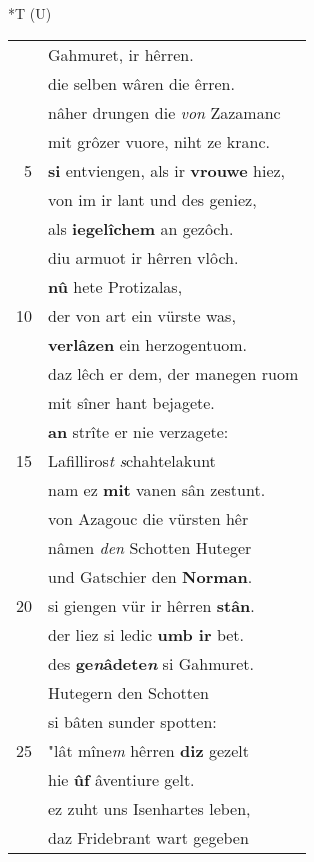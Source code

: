 \documentclass[8pt,a4paper,notitlepage]{article}
\begin{document}
\begin{table}[ht]
\begin{minipage}[t]{0.5\linewidth}
\end{minipage}
\hspace{0.5cm}
\begin{minipage}[t]{0.5\linewidth}
\small
\begin{center}*T (U)
\end{center}
\begin{tabular}{rl}
 & Gahmuret, ir hêrren.\\ 
 & die selben wâren die êrren.\\ 
 & nâher drungen die \textit{von} Zazamanc\\ 
 & mit grôzer vuore, niht ze kranc.\\ 
5 & \textbf{si} entviengen, als ir \textbf{vrouwe} hiez,\\ 
 & von im ir lant und des geniez,\\ 
 & als \textbf{iegelîchem} an gezôch.\\ 
 & diu armuot ir hêrren vlôch.\\ 
 & \textbf{nû} hete Protizalas,\\ 
10 & der von art ein vürste was,\\ 
 & \textbf{verlâzen} ein herzogentuom.\\ 
 & daz lêch er dem, der manegen ruom\\ 
 & mit sîner hant bejagete.\\ 
 & \textbf{an} strîte er nie verzagete:\\ 
15 & Lafilliros\textit{t} \textit{s}chahtelakunt\\ 
 & nam ez \textbf{mit} vanen sân zestunt.\\ 
 & von Azagouc die vürsten hêr\\ 
 & nâmen \textit{den} Schotten Huteger\\ 
 & und Gatschier den \textbf{Norman}.\\ 
20 & si giengen vür ir hêrren \textbf{stân}.\\ 
 & der liez si ledic \textbf{umb ir} bet.\\ 
 & des \textbf{ge\textit{n}âdete\textit{n}} si Gahmuret.\\ 
 & Hutegern den Schotten\\ 
 & si bâten sunder spotten:\\ 
25 & "lât mîne\textit{m} hêrren \textbf{diz} gezelt\\ 
 & hie \textbf{ûf} âventiure gelt.\\ 
 & ez zuht uns Isenhartes leben,\\ 
 & daz Fridebrant wart gegeben\\ 

\end{tabular}
\end{minipage}
\end{table}
\end{document}
